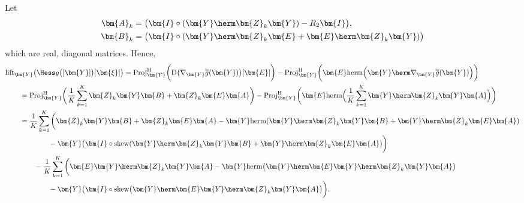 Let 
\begin{align}
	\bm{A}_k&=\big(\bm{I}\circ(\bm{Y}\herm\bm{Z}_k\bm{Y})-R_2\bm{I}\big),\nonumber\\
	\bm{B}_k&=
	\big(\bm{I}\circ(\bm{Y}\herm\bm{Z}_k\bm{E}+\bm{E}\herm\bm{Z}_k\bm{Y})\big)\nonumber
\end{align}
which are real, diagonal matrices. Hence,
\begin{align}
	&\mathrm{lift}_{\bm{Y}}\big(\Hess g \big([\bm{Y}]\big)[\bm{\xi}]\big)= \mathrm{Proj}_{\bm{Y}}^{\mathrm{H}}\bigg(\mathrm{D}\big(\nabla_{\bm{Y}}\overline{\overline{g}}(\bm{Y})\big)[\bm{E}]\bigg)
	-\mathrm{Proj}_{\bm{Y}}^{\mathrm{H}}\bigg(\bm{E}\mathrm{herm}\Big(\bm{Y}\herm\nabla_{\bm{Y}} \overline{\overline{g}}(\bm{Y})\Big)\bigg)\nonumber\\
	&\qquad=\mathrm{Proj}_{\bm{Y}}^{\mathrm{H}}\bigg(\frac{1}{K}\sum_{k=1}^K\bm{Z}_k\bm{Y}\bm{B}+\bm{Z}_k\bm{E}\bm{A}\bigg)
	-\mathrm{Proj}_{\bm{Y}}^{\mathrm{H}}\bigg(\bm{E}\mathrm{herm}\Big(\frac{1}{K}\sum_{k=1}^K\bm{Y}\herm\bm{Z}_k\bm{Y}\bm{A}\Big)\bigg)\nonumber\\
	&\qquad=\frac{1}{K}\sum_{k=1}^K\bigg(\bm{Z}_k\bm{Y}\bm{B}+\bm{Z}_k\bm{E}\bm{A}-\bm{Y}\mathrm{herm}(\bm{Y}\herm\bm{Z}_k\bm{Y}\bm{B}+\bm{Y}\herm\bm{Z}_k\bm{E}\bm{A})\nonumber\\
	&\qquad\qquad\qquad
	-\bm{Y}\big(\bm{I}\circ\mathrm{skew}(\bm{Y}\herm\bm{Z}_k\bm{Y}\bm{B}+\bm{Y}\herm\bm{Z}_k\bm{E}\bm{A})\bigg)\nonumber\\
	&\qquad\qquad-\frac{1}{K}\sum_{k=1}^K\bigg(\bm{E}\bm{Y}\herm\bm{Z}_k\bm{Y}\bm{A}-\bm{Y}\mathrm{herm}\big(\bm{Y}\herm\bm{E}\bm{Y}\herm\bm{Z}_k\bm{Y}\bm{A}\big)
	\nonumber\\&\qquad\qquad\qquad
	-\bm{Y}\big(\bm{I}\circ\mathrm{skew}\big(\bm{Y}\herm\bm{E}\bm{Y}\herm\bm{Z}_k\bm{Y}\bm{A}\big)\bigg).
\end{align}

